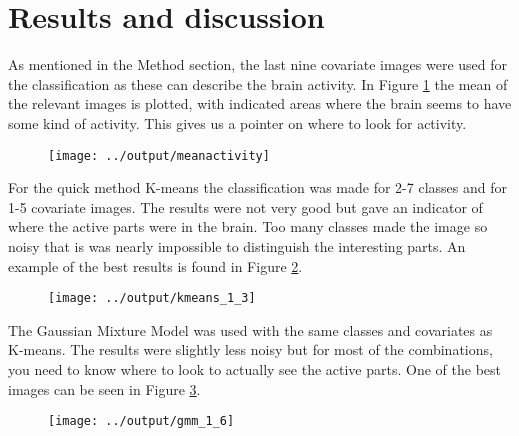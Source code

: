 \documentclass[a4paper,english]{article}
\begin{document}
\section{Results and discussion}

As mentioned in the Method section, the last nine covariate images were used for the classification as these can describe the brain activity. In Figure \ref{fig:mean} the mean of the relevant images is plotted, with indicated areas where the brain seems to have some kind of activity. This gives us a pointer on where to look for activity.

\begin{figure}[H]
	\centering
    \texttt{[image: ../output/meanactivity]}
    \caption{}
    \label{fig:mean}
\end{figure}

For the quick method K-means the classification was made for 2-7 classes and for 1-5 covariate images. The results were not very good but gave an indicator of where the active parts were in the brain. Too many classes made the image so noisy that is was nearly impossible to distinguish the interesting parts. An example of the best results is found in Figure \ref{fig:kmeans}.

\begin{figure}[H]
	\centering
    \texttt{[image: ../output/kmeans\_1\_3]}
    \caption{}
    \label{fig:kmeans}
\end{figure}

The Gaussian Mixture Model was used with the same classes and covariates as K-means. The results were slightly less noisy but for most of the combinations, you need to know where to look to actually see the active parts. One of the best images can be seen in Figure \ref{fig:gmm}.


\begin{figure}[H]
	\centering
    \texttt{[image: ../output/gmm\_1\_6]}
    \caption{}
    \label{fig:gmm}
\end{figure}
\end{document}
